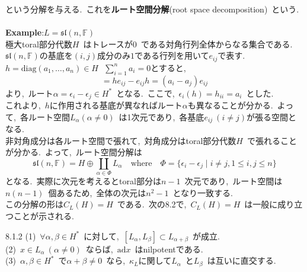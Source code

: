 \documentclass[uplatex,dvipdfmx]{jsarticle}
\begin{document}
という分解を与える.~これを\textbf{ルート空間分解}(root space decomposition)~という.\\\\
\textbf{Example}:$L = \mathfrak{sl}(n,\mathbb{F})$\\
極大toral部分代数$H$~はトレースが$0$~である対角行列全体からなる集合である.\\
$\mathfrak{sl}(n,\mathbb{F})$の基底を$(i,j)$成分のみ$1$である行列を用いて$e_{ij}$で表す.\\
$h = \text{diag}(a_1, \ldots, a_n)\in H~~~\sum_{i=1}^n a_i = 0$とすると,
\begin{equation*}
    [h,e_{ij}] = h e_{ij} - e_{ij} h = (a_i - a_j) e_{ij}
\end{equation*}
より,~ルート$\alpha = \epsilon_i -\epsilon_j \in H^*$~となる.~ここで,~$\epsilon_i (h) = h_{ii} = a_i$~とした.\\
これより,~$h$に作用される基底が異なればルート$\alpha$も異なることが分かる.~よって,~各ルート空間$L_\alpha (\alpha \neq 0)$~は1次元であり,~各基底$e_{ij}~(i\neq j)$が張る空間となる.\\
非対角成分は各ルート空間で張れて,~対角成分はtoral部分代数$H$~で張れることが分かる.~よって,~ルート空間分解は
\begin{equation*}
    \mathfrak{sl}(n,\mathbb{F}) = H \oplus \coprod_{\alpha \in \Phi} L_\alpha \quad \text{where} \quad \Phi = \{ \epsilon_i - \epsilon_j \mid i\neq j, 1 \leq i,j \leq n \}
\end{equation*}
となる.~実際に次元を考えるとtoral部分は$n-1$~次元であり,~ルート空間は$n(n-1)$~個あるため,~全体の次元は$n^2 - 1$~となり一致する.\\
この分解の形は$C_L(H) = H$~である.~次の8.2で,~$C_L(H) = H$~は一般に成り立つことが示される.
\begin{myprop}{8.1.2}
    (1)~$\forall \alpha,\beta \in H^*$~に対して,~$[L_\alpha, L_\beta] \subset L_{\alpha + \beta}$~が成立.\\
    (2)~$x \in L_\alpha~(\alpha \neq 0)$~ならば,~$\text{ad}x$~はnilpotentである.\\
    (3)~$\alpha,\beta \in H^*$~で$\alpha + \beta \neq 0$~なら,~$\kappa_L$に関して$L_\alpha$~と$L_\beta$~は互いに直交する.
\end{myprop}
\end{document}
